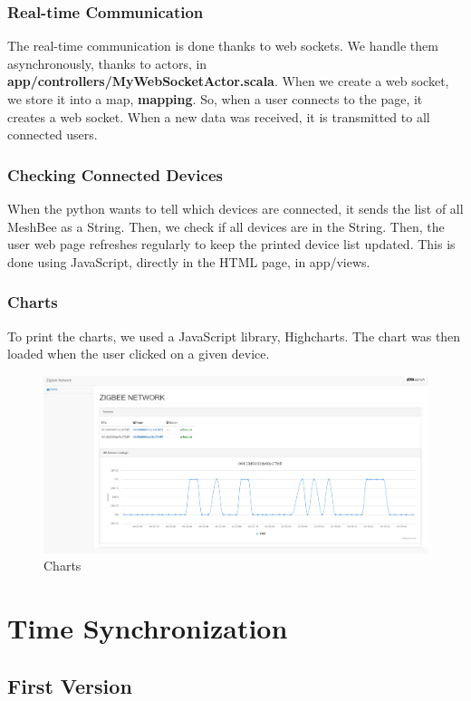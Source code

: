 \subsubsection{Real-time Communication}

The real-time communication is done thanks to web sockets. We handle them asynchronously, thanks to actors, in \textbf{app/controllers/MyWebSocketActor.scala}. When we create a web socket, we store it into a map, \textbf{mapping}. So, when a user connects to the page, it creates a web socket. When a new data was received, it is transmitted to all connected users.

\subsubsection{Checking Connected Devices}

When the python wants to tell which devices are connected, it sends the list of all MeshBee as a String. Then, we check if all devices are in the String. Then, the user web page refreshes regularly to keep the printed device list updated. This is done using JavaScript, directly in the HTML page, in app/views.

\subsubsection{Charts}

To print the charts, we used a JavaScript library, Highcharts. The chart was then loaded when the user clicked on a given device.

\begin{figure}[ht]
\centering
\includegraphics[width=.6\linewidth]{homepage}
\caption[Charts]{\label{f:homepage}Charts}
\end{figure}

\section{Time Synchronization}

\subsection{First Version}


